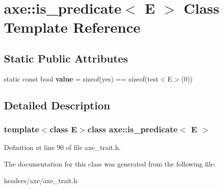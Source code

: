 \hypertarget{classaxe_1_1is__predicate}{\section{axe\+:\+:is\+\_\+predicate$<$ E $>$ Class Template Reference}
\label{classaxe_1_1is__predicate}
}
\subsection*{Static Public Attributes}
\begin{DoxyCompactItemize}
\item 
\hypertarget{classaxe_1_1is__predicate_a480eb56d2142c506dfe64a33730aee0e}{static const bool {\bfseries value} = sizeof(yes) == sizeof(test$<$E$>$(0))}\label{classaxe_1_1is__predicate_a480eb56d2142c506dfe64a33730aee0e}

\end{DoxyCompactItemize}


\subsection{Detailed Description}
\subsubsection*{template$<$class E$>$class axe\+::is\+\_\+predicate$<$ E $>$}



Definition at line 90 of file axe\+\_\+trait.\+h.



The documentation for this class was generated from the following file\+:\begin{DoxyCompactItemize}
\item 
headers/axe/axe\+\_\+trait.\+h\end{DoxyCompactItemize}
